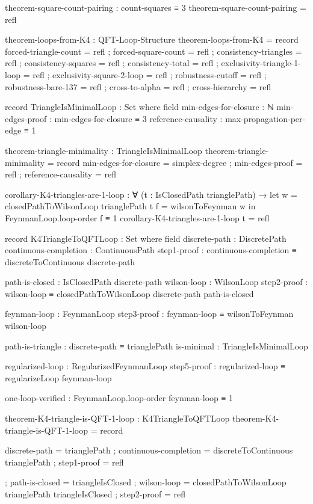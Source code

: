 \documentclass[11pt,a4paper]{book}
\begin{document}
\begin{code}
theorem-square-count-pairing : count-squares ≡ 3
theorem-square-count-pairing = refl

theorem-loops-from-K4 : QFT-Loop-Structure
theorem-loops-from-K4 = record
  { forced-triangle-count = refl
  ; forced-square-count = refl
  ; consistency-triangles = refl
  ; consistency-squares = refl
  ; consistency-total = refl
  ; exclusivity-triangle-1-loop = refl
  ; exclusivity-square-2-loop = refl
  ; robustness-cutoff = refl
  ; robustness-bare-137 = refl
  ; cross-to-alpha = refl
  ; cross-hierarchy = refl
  }

record TriangleIsMinimalLoop : Set where
  field
    min-edges-for-closure : ℕ
    min-edges-proof : min-edges-for-closure ≡ 3
    reference-causality : max-propagation-per-edge ≡ 1

theorem-triangle-minimality : TriangleIsMinimalLoop
theorem-triangle-minimality = record
  { min-edges-for-closure = simplex-degree
  ; min-edges-proof = refl
  ; reference-causality = refl
  }


corollary-K4-triangles-are-1-loop : ∀ (t : IsClosedPath trianglePath) →
  let w = closedPathToWilsonLoop trianglePath t
      f = wilsonToFeynman w
  in FeynmanLoop.loop-order f ≡ 1
corollary-K4-triangles-are-1-loop t = refl

record K4TriangleToQFTLoop : Set where
  field
    discrete-path : DiscretePath
    continuous-completion : ContinuousPath
    step1-proof : continuous-completion ≡ discreteToContinuous discrete-path
    
    path-is-closed : IsClosedPath discrete-path
    wilson-loop : WilsonLoop
    step2-proof : wilson-loop ≡ closedPathToWilsonLoop discrete-path path-is-closed
    
    feynman-loop : FeynmanLoop
    step3-proof : feynman-loop ≡ wilsonToFeynman wilson-loop
    
    path-is-triangle : discrete-path ≡ trianglePath
    is-minimal : TriangleIsMinimalLoop
    
    regularized-loop : RegularizedFeynmanLoop
    step5-proof : regularized-loop ≡ regularizeLoop feynman-loop
    
    one-loop-verified : FeynmanLoop.loop-order feynman-loop ≡ 1

theorem-K4-triangle-is-QFT-1-loop : K4TriangleToQFTLoop
theorem-K4-triangle-is-QFT-1-loop = record
  { discrete-path = trianglePath
  ; continuous-completion = discreteToContinuous trianglePath
  ; step1-proof = refl
  
  ; path-is-closed = triangleIsClosed
  ; wilson-loop = closedPathToWilsonLoop trianglePath triangleIsClosed
  ; step2-proof = refl
  
}
\end{code}
\end{document}
